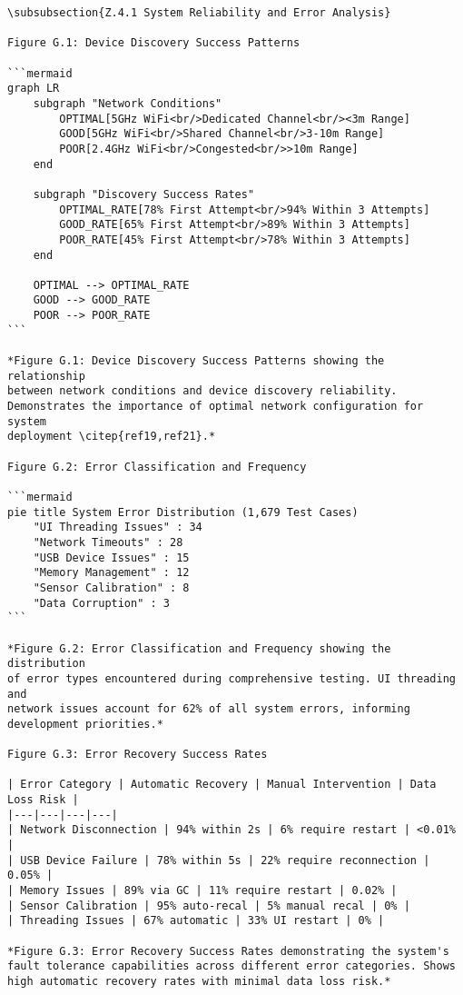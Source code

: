 \begin{verbatim}
\subsubsection{Z.4.1 System Reliability and Error Analysis}

Figure G.1: Device Discovery Success Patterns

```mermaid
graph LR
    subgraph "Network Conditions"
        OPTIMAL[5GHz WiFi<br/>Dedicated Channel<br/><3m Range]
        GOOD[5GHz WiFi<br/>Shared Channel<br/>3-10m Range]
        POOR[2.4GHz WiFi<br/>Congested<br/>>10m Range]
    end

    subgraph "Discovery Success Rates"
        OPTIMAL_RATE[78% First Attempt<br/>94% Within 3 Attempts]
        GOOD_RATE[65% First Attempt<br/>89% Within 3 Attempts]
        POOR_RATE[45% First Attempt<br/>78% Within 3 Attempts]
    end

    OPTIMAL --> OPTIMAL_RATE
    GOOD --> GOOD_RATE
    POOR --> POOR_RATE
```

*Figure G.1: Device Discovery Success Patterns showing the relationship
between network conditions and device discovery reliability.
Demonstrates the importance of optimal network configuration for system
deployment \citep{ref19,ref21}.*

Figure G.2: Error Classification and Frequency

```mermaid
pie title System Error Distribution (1,679 Test Cases)
    "UI Threading Issues" : 34
    "Network Timeouts" : 28
    "USB Device Issues" : 15
    "Memory Management" : 12
    "Sensor Calibration" : 8
    "Data Corruption" : 3
```

*Figure G.2: Error Classification and Frequency showing the distribution
of error types encountered during comprehensive testing. UI threading and
network issues account for 62% of all system errors, informing
development priorities.*

Figure G.3: Error Recovery Success Rates

| Error Category | Automatic Recovery | Manual Intervention | Data Loss Risk |
|---|---|---|---|
| Network Disconnection | 94% within 2s | 6% require restart | <0.01% |
| USB Device Failure | 78% within 5s | 22% require reconnection | 0.05% |
| Memory Issues | 89% via GC | 11% require restart | 0.02% |
| Sensor Calibration | 95% auto-recal | 5% manual recal | 0% |
| Threading Issues | 67% automatic | 33% UI restart | 0% |

*Figure G.3: Error Recovery Success Rates demonstrating the system's
fault tolerance capabilities across different error categories. Shows
high automatic recovery rates with minimal data loss risk.*


\end{verbatim}

